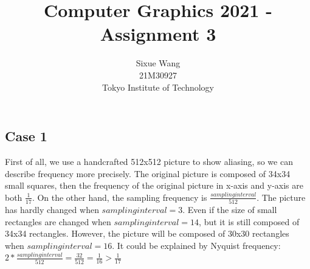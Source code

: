 \documentclass{article}
\title{Computer Graphics 2021 - Assignment 3}
\author{Sixue Wang\\21M30927\\Tokyo Institute of Technology}
\begin{document}
\maketitle

\section{}
\subsection{Case 1}
First of all, we use a handcrafted 512x512 picture to show aliasing, so we can describe frequency more precisely. The original picture is composed of 34x34 small squares, then the frequency of the original picture in x-axis and y-axis are both $\frac{1}{17}$. On the other hand, the sampling frequency is $\frac{sampling interval}{512}$. The picture has hardly changed when $sampling interval = 3$. Even if the size of small rectangles are changed when $sampling interval = 14$, but it is still composed of 34x34 rectangles. However, the picture will be composed of 30x30 rectangles when $sampling interval = 16$. It could be explained by Nyquist frequency: $2*\frac{sampling interval}{512}=\frac{32}{512}=\frac{1}{16}>\frac{1}{17}$
\end{document}
